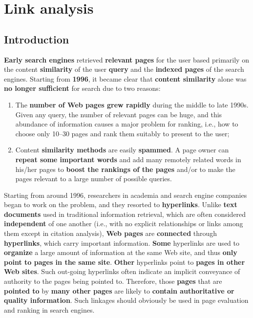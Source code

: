 \section{Link analysis}
\subsection{Introduction}
\textbf{Early search engines} retrieved \textbf{relevant pages} for the user based primarily on the content \textbf{similarity} of the user \textbf{query} and the \textbf{indexed pages} of the search engines. Starting from \textbf{1996}, it became clear that \textbf{content similarity} alone was \textbf{no longer sufficient} for search due to two reasons:

\begin{enumerate}
    \item The \textbf{number of Web pages grew rapidly} during the middle to late 1990s. Given any query, the number of relevant pages can be huge, and this abundance of information causes a major problem for ranking, i.e., how to choose only 10–30 pages and rank them suitably to present to the user;
    \item Content \textbf{similarity methods} are easily \textbf{spammed}. A page owner can \textbf{repeat some important words} and add many remotely related words in his/her pages to \textbf{boost the rankings of the pages} and/or to make the pages relevant to a large number of possible queries.
\end{enumerate}

Starting from around 1996, researchers in academia and search engine companies began to work on the problem, and they resorted to \textbf{hyperlinks}. Unlike \textbf{text documents} used in traditional information retrieval, which are often considered \textbf{independent} of one another (i.e., with no explicit relationships or links among them except in citation analysis), \textbf{Web pages} are \textbf{connected} through \textbf{hyperlinks}, which carry important information. \textbf{Some} hyperlinks are used to \textbf{organize} a large amount of information at the same Web site, and thus \textbf{only point to pages in the same site}. \textbf{Other} hyperlinks point to \textbf{pages in other Web sites}. Such out-going hyperlinks often indicate an implicit conveyance of authority to the pages being pointed to. Therefore, those \textbf{pages} that are \textbf{pointed to} by \textbf{many other pages} are likely to \textbf{contain authoritative or quality information}. Such linkages should obviously be used in page evaluation and ranking in search engines. 

